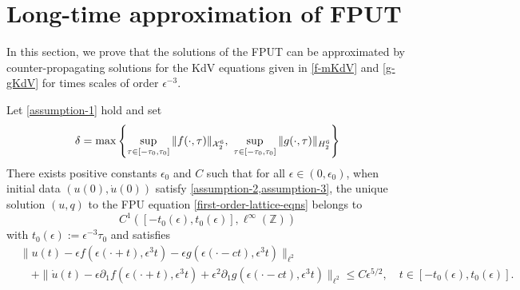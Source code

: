 \section{Long-time approximation of FPUT}

In this section, we prove that the solutions of the FPUT can be approximated by counter-propagating solutions for the KdV equations given in \cref{f-mKdV} and \cref{g-gKdV} for times scales of order \(\epsilon^{-3}\).

\begin{theorem}
	Let \cref{assumption-1} hold and set
	\begin{equation}
		\delta = \max \left\{\sup_{\tau\in[-\tau_0, \tau_0]}\|f(\cdot,\tau)\|_{\mathcal{X}^6_2},\ \sup_{\tau\in[-\tau_0, \tau_0]} \|g(\cdot, \tau)\|_{H^6_2} \right\}
	\end{equation}
	There exists positive constants \(\epsilon_0\) and \(C\) such that for all \(\epsilon \in(0,\epsilon_0)\), when initial data \((u(0), \dot u(0))\) satisfy \cref{assumption-2,assumption-3}, the unique solution \((u,q)\) to the FPU equation \cref{first-order-lattice-eqns} belongs to 
	\begin{equation}
		C^1([-t_0(\epsilon), t_0(\epsilon)], \ell^\infty(\mathbb Z))
	\end{equation}
	with \(t_0(\epsilon):= \epsilon^{-3}\tau_0 \) and satisfies
	\begin{equation}
		\begin{aligned}
			&\| u(t) - \epsilon f(\epsilon(\cdot+t), \epsilon^3 t) -\epsilon g(\epsilon(\cdot -ct) ,\epsilon^3 t) \|_{\ell^2} \\
			&\quad + \| \dot u(t) - \epsilon \partial_1 f(\epsilon (\cdot +t),\epsilon^3t)  +\epsilon^2 \partial_1 g(\epsilon(\cdot - ct), \epsilon^3t)\|_{\ell^2} \leq C \epsilon^{5/2 }, \quad t\in[-t_0(\epsilon), t_0(\epsilon)].
		\end{aligned}
	\end{equation}
\end{theorem}

